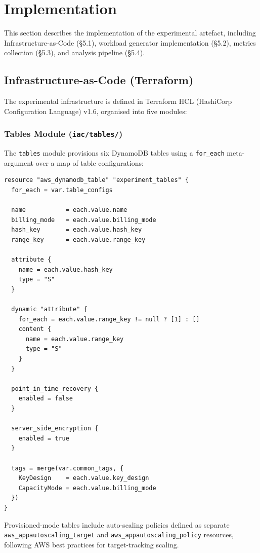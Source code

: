 \section{Implementation}

This section describes the implementation of the experimental artefact, including Infrastructure-as-Code (§5.1), workload generator implementation (§5.2), metrics collection (§5.3), and analysis pipeline (§5.4).

\subsection{Infrastructure-as-Code (Terraform)}

The experimental infrastructure is defined in Terraform HCL (HashiCorp Configuration Language) v1.6, organised into five modules:

\subsubsection{Tables Module (\texttt{iac/tables/})}

The \texttt{tables} module provisions six DynamoDB tables using a \texttt{for\_each} meta-argument over a map of table configurations:

\begin{verbatim}
resource "aws_dynamodb_table" "experiment_tables" {
  for_each = var.table_configs
  
  name           = each.value.name
  billing_mode   = each.value.billing_mode
  hash_key       = each.value.hash_key
  range_key      = each.value.range_key
  
  attribute {
    name = each.value.hash_key
    type = "S"
  }
  
  dynamic "attribute" {
    for_each = each.value.range_key != null ? [1] : []
    content {
      name = each.value.range_key
      type = "S"
    }
  }
  
  point_in_time_recovery {
    enabled = false
  }
  
  server_side_encryption {
    enabled = true
  }
  
  tags = merge(var.common_tags, {
    KeyDesign    = each.value.key_design
    CapacityMode = each.value.billing_mode
  })
}
\end{verbatim}

Provisioned-mode tables include auto-scaling policies defined as separate \texttt{aws\_appautoscaling\_target} and \texttt{aws\_appautoscaling\_policy} resources, following AWS best practices for target-tracking scaling.


